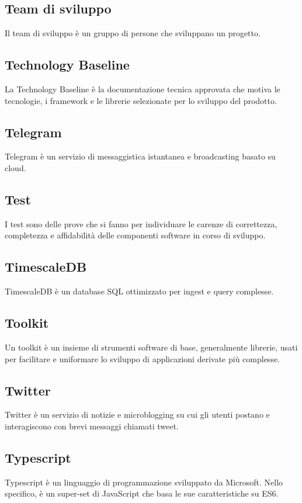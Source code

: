 
\subsection*{Team di sviluppo}
Il team di sviluppo è un gruppo di persone che sviluppano un progetto.

\subsection*{Technology Baseline}
La Technology Baseline è la documentazione tecnica approvata che motiva le tecnologie, i framework e le librerie selezionate per lo sviluppo del prodotto.

\subsection*{Telegram}
Telegram è un servizio di messaggistica istantanea e broadcasting basato su cloud.

\subsection*{Test}
I test sono delle prove che si fanno per individuare le carenze di correttezza, completezza e affidabilità delle componenti software in corso di sviluppo.

\subsection*{TimescaleDB}
TimescaleDB è un database SQL ottimizzato per ingest e query complesse.


\subsection*{Toolkit}
Un toolkit è un insieme di strumenti software di base, generalmente librerie, usati per facilitare e uniformare lo sviluppo di applicazioni derivate più complesse.

\subsection*{Twitter}
Twitter è un servizio di notizie e microblogging su cui gli utenti postano e interagiscono con brevi messaggi chiamati tweet.

\subsection*{Typescript}
Typescript è un linguaggio di programmazione sviluppato da Microsoft. Nello specifico, è un super-set di JavaScript che basa le sue caratteristiche su ES6.


